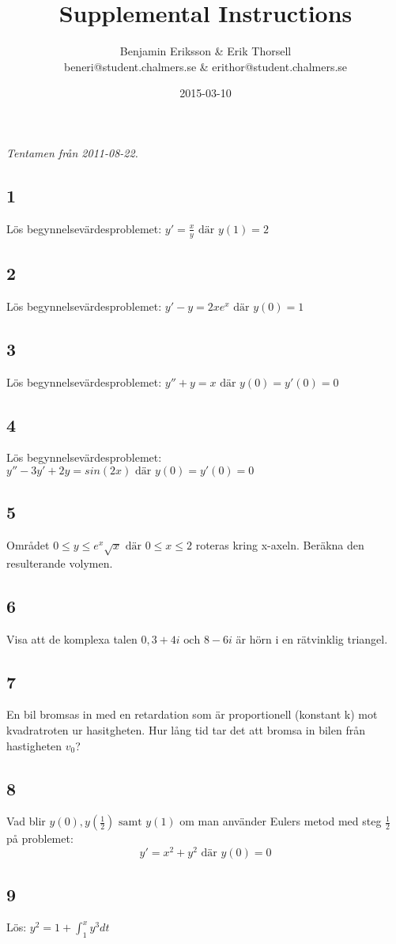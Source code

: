 \documentclass{article}
\title{Supplemental Instructions}
\author{Benjamin Eriksson \& Erik Thorsell \\ 
		\small{beneri@student.chalmers.se} \&
		\small{erithor@student.chalmers.se}
}
\date{
      2015-03-10
     }
\begin{document}
\maketitle
\emph{Tentamen från 2011-08-22.}\\

\subsection*{1}
Lös begynnelsevärdesproblemet: $y' = \frac{x}{y} \text{ där } y(1) = 2$

\subsection*{2}
Lös begynnelsevärdesproblemet: $y' - y = 2xe^x \text{ där } y(0) = 1$

\subsection*{3}
Lös begynnelsevärdesproblemet: $y'' + y = x \text{ där } y(0)=y'(0)=0$

\subsection*{4}
Lös begynnelsevärdesproblemet: $y'' - 3y' + 2y = sin(2x) \text{ där } y(0)=y'(0)=0$

\subsection*{5}
Området $0 \leq y \leq e^x \sqrt{x} \text{ där } 0 \leq x \leq 2$ roteras kring 
x-axeln. Beräkna den resulterande volymen.

\subsection*{6}
Visa att de komplexa talen $0, 3+4i \text{ och } 8-6i$ är hörn i en rätvinklig 
triangel.

\subsection*{7}
En bil bromsas in med en retardation som är proportionell (konstant k) mot 
kvadratroten ur hasitgheten. Hur lång tid tar det att bromsa in bilen från 
hastigheten $v_0$?

\subsection*{8}
Vad blir $y(0), y(\frac{1}{2}) \text{ samt } y(1)$ om man använder Eulers metod 
med steg $\frac{1}{2}$ på problemet: $$y'=x^2+y^2 \text{ där } y(0)=0$$

\subsection*{9}
Lös: $y^2 = 1 + \int_{1}^{x} {y^3 dt}$
\end{document}
